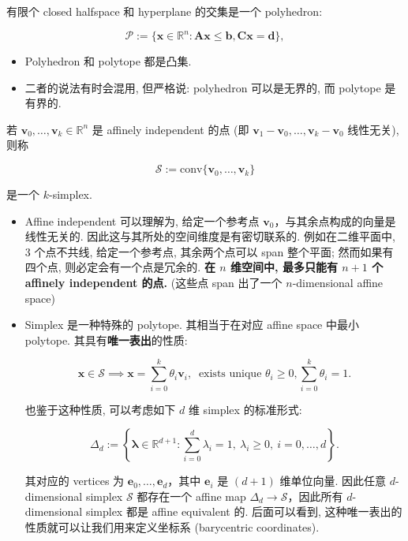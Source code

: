\begin{defblock}
有限个 closed halfspace 和 hyperplane 的交集是一个 polyhedron:

\[
\mathcal{P} := \{\bm{x} \in \mathbb{R}^n: \bm{A}\bm{x} \leq \bm{b}, \bm{C}\bm{x} = \bm{d}\},
\]

\begin{itemize}
\item {}Polyhedron 和 polytope 都是凸集.


\item {}二者的说法有时会混用, 但严格说: polyhedron 可以是无界的, 而 polytope 是有界的.


\end{itemize}

\end{defblock}


\begin{defblock}[{Simplex}]
若 $\bm{v}_0, \ldots, \bm{v}_k \in \mathbb{R}^n$ 是 affinely independent 的点 (即 $\bm{v}_1-\bm{v}_0, \ldots, \bm{v}_k-\bm{v}_0$ 线性无关), 则称

\[
\mathcal{S} := \text{conv}\{\bm{v}_0, \ldots, \bm{v}_k\} 
\]

是一个 $k$-simplex.

\begin{itemize}
\item {}Affine independent 可以理解为, 给定一个参考点 $\bm{v}_0$，与其余点构成的向量是线性无关的. 因此这与其所处的空间维度是有密切联系的. 例如在二维平面中, 3 个点不共线, 给定一个参考点, 其余两个点可以 span 整个平面; 然而如果有四个点, 则必定会有一个点是冗余的. \textbf{在 $n$ 维空间中, 最多只能有 $n+1$ 个 affinely independent 的点.} (这些点 span 出了一个 $n$-dimensional affine space)


\item {}Simplex 是一种特殊的 polytope. 其相当于在对应 affine space 中最小 polytope. 其具有\textbf{唯一表出}的性质:

\[
\bm{x} \in \mathcal{S} \implies \bm{x} = \sum_{i=0}^k \theta_i \bm{v}_i,~ \text{ exists unique } \theta_i \geq 0, \sum_{i=0}^k \theta_i = 1.
\]

也鉴于这种性质, 可以考虑如下 $d$ 维 simplex 的标准形式:

\[
\Delta_d := \left\{\bm{\lambda} \in \mathbb{R}^{d+1}: \sum_{i=0}^d \lambda_i = 1,~ \lambda_i \geq 0,~ i=0,\ldots,d\right\}.
\]

其对应的 vertices 为 $\bm{e}_0, \ldots, \bm{e}_d$，其中 $\bm{e}_i$ 是 $(d+1)$ 维单位向量. 因此任意 $d$-dimensional simplex $\mathcal{S}$ 都存在一个 affine map $\Delta_d \to \mathcal{S}$，因此所有 $d$-dimensional simplex 都是 affine equivalent 的. 后面可以看到, 这种唯一表出的性质就可以让我们用来定义坐标系 (barycentric coordinates).


\end{itemize}

\end{defblock}


